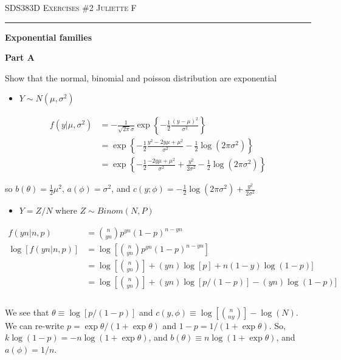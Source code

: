 \documentclass[12pt]{amsart}
\begin{document}
\thispagestyle{empty}

{\scshape SDS383D} \hfill {\scshape \Large Exercises \#2} \hfill {\scshape Juliette F}
 \medskip
\hrule
\bigskip
\bigskip

{\bf \large Exponential families} 
\bigskip



{\bf Part A} 
\bigskip

Show that the normal, binomial and poisson distribution are exponential

\begin{itemize}
    \item $Y \sim N(\mu, \sigma^2) $
\end{itemize}
\bigskip
\bigskip

\begin{align*}
f(y|\mu,\sigma^2)&= -\frac{1}{\sqrt{2\pi}\sigma} \exp \left\{ -\frac{1}{2} \frac{(y-\mu)^2}{\sigma^2}\right\}\\
&=\exp \left\{ -\frac{1}{2} \frac{y^2-2y\mu + \mu^2}{\sigma^2}  -\frac{1}{2}\log ( 2\pi\sigma^2)\right\} \\
&=  \exp \left\{ -\frac{1}{2} \frac{-2y\mu + \mu^2}{\sigma^2} + \frac{y^2}{2\sigma^2} -\frac{1}{2}\log ( 2\pi\sigma^2)\right\}
\end{align*}

\bigskip
\bigskip

so $b(\theta) = \frac{1}{2}\mu^2$, $a(\phi) = \sigma^2$, and $ c(y;\phi) =-\frac{1}{2}\log ( 2\pi\sigma^2) + \frac{y^2}{2\sigma^2} $

\bigskip
\bigskip


\begin{itemize}
    \item $Y=Z/N $ where $Z \sim Binom(N, P)$
\end{itemize}
\medskip


\begin{align*}
f(yn|n,p)&= {n \choose yn} p^{yn} (1-p)^{n-yn}\\
\log[f(yn|n,p)]&= \log[{n \choose yn} p^{yn} (1-p)^{n-yn}]\\
&=\log[{n \choose yn}]+(yn)\log[p] + n(1-y) \log(1-p)]\\
&=\log[{n \choose yn}]+(yn)\log[p/(1-p)] -(yn) \log(1-p)]\\
\end{align*}\\



We see that $\theta \equiv\log[p/(1-p)] $ and $c(y, \phi) \equiv \log[{n \choose ny}] - \log(N) $. We can re-write $p = \exp\theta/(1+\exp\theta)$ and $1-p = 1/(1+\exp\theta)$. So, $k \log(1-p) = -n \log(1+\exp\theta)$, and $b(\theta) \equiv n \log(1+\exp\theta)$, and $a(\phi)=1/n $. 
\end{document}
